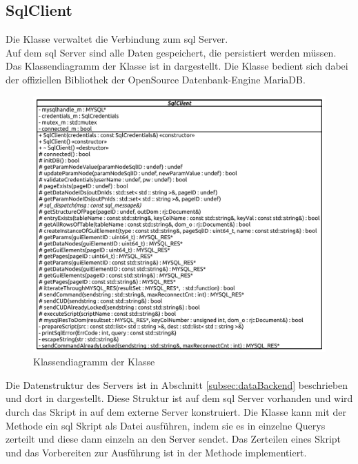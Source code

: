 \subsection{SqlClient}
Die  Klasse verwaltet die Verbindung zum \ac{sql} Server. \\Auf dem \ac{sql} Server sind alle Daten gespeichert, die persistiert werden müssen. 
Das Klassendiagramm der  Klasse ist in  dargestellt.
Die Klasse bedient sich dabei der offiziellen Bibliothek  der OpenSource Datenbank-Engine MariaDB.
\begin{figure}[ht]
  \centering
  \includegraphics[width=\textwidth]{content/hauptteil/umsetzungPoC/backend/uml/classesOfOverview/SqlClient.pdf}
  \caption{Klassendiagramm der Klasse }
  \label{fig:backend:classDiag:SqlClient}
\end{figure}
Die Datenstruktur des Servers ist in Abschnitt \ref{subsec:dataBackend} beschrieben und dort in  dargestellt.
Diese Struktur ist auf dem \ac{sql} Server vorhanden und wird durch das Skript in  auf dem externe Server konstruiert.
Die  Klasse kann mit der Methode  ein \ac{sql} Skript als Datei ausführen, indem sie es in einzelne Querys zerteilt und diese dann einzeln an den Server sendet.
Das Zerteilen eines Skript und das Vorbereiten zur Ausführung ist in der Methode  implementiert. 
